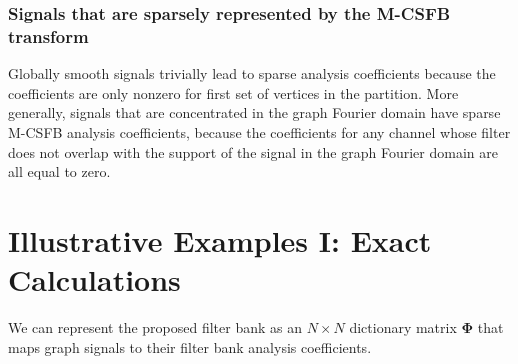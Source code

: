 \documentclass[journal, 10pt]{IEEEtran}
\begin{document}
\subsubsection{Signals that are sparsely represented by the M-CSFB transform}
Globally smooth signals trivially lead to sparse analysis coefficients because the coefficients are only nonzero for first set of vertices in the partition. More generally, signals that are concentrated in the graph Fourier domain %
have sparse M-CSFB analysis coefficients, because the coefficients for any channel whose filter does not overlap with the support of the signal in the graph Fourier domain are all equal to zero. %

\section{Illustrative Examples I: Exact Calculations} \label{Se:ill1}
We can represent the proposed filter bank as an $N \times N$ dictionary matrix $\boldsymbol{\Phi}$ that maps graph signals to their filter bank analysis coefficients. 
\end{document}
